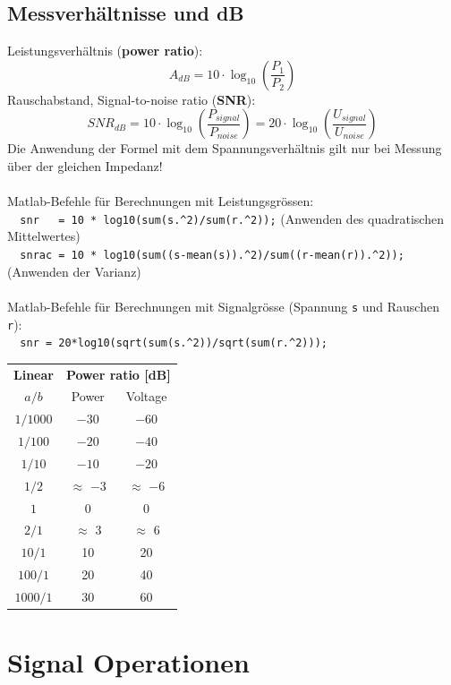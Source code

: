 \subsection{Messverhältnisse und dB}
Leistungsverhältnis (\textbf{power ratio}):
\[ A_{dB} = 10 \cdot \log_{10} \left( \frac{P_1}{P_2} \right) \]
Rauschabstand, Signal-to-noise ratio (\textbf{SNR}):
\[ SNR_{dB} = 10 \cdot \log_{10} \left( \frac{P_{signal}}{P_{noise}} \right) = 20 \cdot \log_{10} \left( \frac{U_{signal}}{U_{noise}} \right) \]
Die Anwendung der Formel mit dem Spannungsverhältnis gilt nur bei Messung über der gleichen Impedanz!\\\\
Matlab-Befehle für Berechnungen mit Leistungsgrössen:\\ 
\verb|  snr   = 10 * log10(sum(s.^2)/sum(r.^2));| (Anwenden des quadratischen Mittelwertes)\\
\verb|  snrac = 10 * log10(sum((s-mean(s)).^2)/sum((r-mean(r)).^2));| (Anwenden der Varianz)\\\\
Matlab-Befehle für Berechnungen mit Signalgrösse (Spannung \verb|s| und Rauschen \verb|r|):\\ 
\verb|  snr = 20*log10(sqrt(sum(s.^2))/sqrt(sum(r.^2)));|
\begin{table}[ht]
  \centering
  \begin{tabular}{ccc} \toprule
  \textbf{Linear}	& \multicolumn{2}{c}{\textbf{Power ratio [dB]}} \\ 
  $a/b$		& Power		& Voltage	\\ \midrule
  $1/1000$	& $-30$		& $-60$		\\
  $1/100$	& $-20$		& $-40$		\\
  $1/10$	& $-10$		& $-20$		\\
  $1/2$		& $\approx$ $-3$ & $\approx$ $-6$\\
  $1$		& 0			& 0			\\
  $2/1$		& $\approx$ 3 & $\approx$ 6\\
  $10/1$	& 10		& 20		\\
  $100/1$	& 20		& 40		\\  
  $1000/1$	& 30		& 60		\\\bottomrule
  \end{tabular}
\end{table}
\newpage
\section{Signal Operationen}
